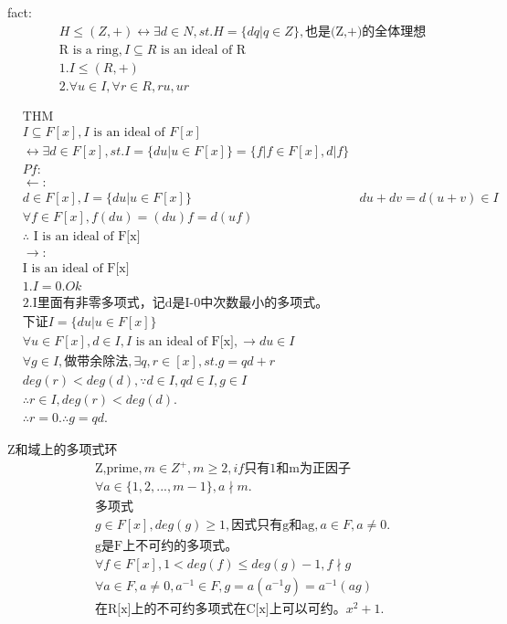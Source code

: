 \documentclass[12pt, a4paper]{article}  %
\begin{document}
fact:
\begin{align}
    & H\leqslant (Z,+)\leftrightarrow \exists d\in N,st.H=\{dq|q\in Z\},\text{也是(Z,+)的全体理想}\\
    & \text{R is a ring},I\subseteq R\text{ is an ideal of R}\\
    &1.I\leqslant (R,+)\\
    &2.\forall u\in I,\forall r\in R,ru,ur
\end{align}

\begin{align}
    &\text{THM}\\
    &I\subseteq F[x],I\text{ is an ideal of }F[x]\\
    &\leftrightarrow \exists d\in F[x],st. I=\{du|u\in F[x]\}=\{f|f\in F[x],d|f\}\\
    &Pf:\\
    & \leftarrow :\\
    & d\in F[x],I=\{du|u\in F[x]\}
    & du+dv=d(u+v)\in I\\
    &\forall f\in F[x],f(du)=(du)f=d(uf)\\
    &\therefore \text{ I is an ideal of F[x]}\\
    & \rightarrow :\\
    &\text{I is an ideal of F[x]}\\
    &1.I={0}.Ok\\
    &2.\text{I里面有非零多项式，记d是I-{0}中次数最小的多项式。}\\
    &\text{下证}I=\{du|u\in F[x]\}\\
    &\forall u\in F[x],d\in I,I\text{ is an ideal of F[x]},\rightarrow du\in I\\
    &\forall g\in I,\text{做带余除法},\exists q,r\in [x],st. g=qd+r\\
    &deg(r)<deg(d),\because d\in I,qd\in I,g\in I \\
    &\therefore r\in I,deg(r)<deg(d).\\
    &\therefore r=0.\therefore g=qd.
\end{align}

Z和域上的多项式环
\begin{align}
    &\text{Z,prime},m\in Z^+,m\geqslant 2,if\text{只有1和m为正因子}\\
    &\forall a\in\{1,2,...,m-1\},a\nmid m.\\
    &\text{多项式}\\
    &g\in F[x],deg(g)\geqslant 1,\text{因式只有g和ag},a\in F,a\neq 0.\\
    &\text{g是F上不可约的多项式。}\\
    &\forall f\in F[x],1< deg(f)\leqslant deg(g)-1,f\nmid g\\
    &\forall a\in F,a\neq 0,a^{-1}\in F,g=a(a^{-1}g)=a^{-1}(ag)\\
    &\text{在R[x]上的不可约多项式在C[x]上可以可约。}x^2+1.
\end{align}
\end{document}
